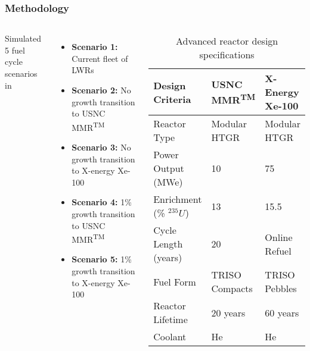 \begin{frame}
    \frametitle{Methodology}
    \begin{columns}
        \column[t]{5cm}
        Simulated 5 fuel cycle scenarios in \Cyclus \cite{huff_fundamental_2016}
    \begin{itemize}
        \item \textbf{Scenario 1:} Current fleet of \glspl{LWR}
        \item \textbf{Scenario 2:} No growth transition to \gls{USNC} \gls{MMR}\textsuperscript{TM}
        \item \textbf{Scenario 3:} No growth transition to X-energy Xe-100
        \item \textbf{Scenario 4:} 1\% growth transition to \gls{USNC} \gls{MMR}\textsuperscript{TM}
        \item \textbf{Scenario 5:} 1\% growth transition to X-energy Xe-100
    \end{itemize}

    \column[t]{5cm}
    \begingroup
        \renewcommand{\arraystretch}{1.5} %
        \begin{table}[t!]
            \tiny
            \caption{Advanced reactor design specifications}
            \label{tab:reactor_summary}
            \begin{tabular}{ p{1.5cm} p{1.5cm} p{1.25cm}}
                \hline
                Design Criteria & \gls{USNC} \gls{MMR}\textsuperscript{TM} & 
                    X-Energy Xe-100 \\\hline
                
                Reactor Type & Modular HTGR & Modular HTGR \\
                Power Output (MWe) & 10 & 75 \\
                Enrichment (\% $^{235}U$) & 13 & 15.5 \\
                Cycle Length (years) & 20 & Online Refuel\\
                Fuel Form & TRISO Compacts & TRISO Pebbles\\
                Reactor Lifetime & 20 years & 60 years \\
                Coolant & He & He \\
                \hline
            \end{tabular}
        \end{table}   
        \endgroup
    \end{columns}
\end{frame}


